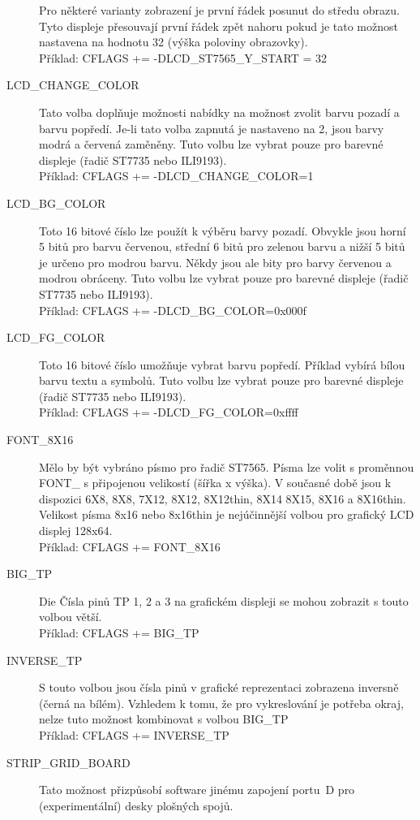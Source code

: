 \begin{description}
Pro některé varianty zobrazení je první řádek posunut do středu obrazu.
Tyto displeje přesouvají první řádek zpět nahoru
pokud je tato možnost nastavena na hodnotu 32 (výška poloviny obrazovky).\\
Příklad: CFLAGS += -DLCD\_ST7565\_Y\_START = 32
\item[LCD\_CHANGE\_COLOR]  Tato volba doplňuje možnosti nabídky na možnost
zvolit barvu pozadí a barvu popředí.
Je-li tato volba zapnutá je nastaveno na 2, jsou barvy modrá a červená zaměněny.
Tuto volbu lze vybrat pouze pro barevné displeje (řadič ST7735 nebo ILI9193).\\
Příklad: CFLAGS += -DLCD\_CHANGE\_COLOR=1
 \item[LCD\_BG\_COLOR] Toto 16 bitové číslo lze použít k výběru barvy pozadí.
Obvykle jsou horní 5 bitů pro barvu červenou, střední 6 bitů pro zelenou barvu
a nižší 5 bitů je určeno pro modrou barvu.
Někdy jsou ale bity pro barvy červenou a modrou obráceny.
Tuto volbu lze vybrat pouze pro barevné displeje (řadič ST7735 nebo ILI9193).\\
Příklad: CFLAGS += -DLCD\_BG\_COLOR=0x000f
 \item[LCD\_FG\_COLOR] Toto 16 bitové číslo umožňuje vybrat barvu popředí.
Příklad vybírá bílou barvu textu a symbolů.
Tuto volbu lze vybrat pouze pro barevné displeje (řadič ST7735 nebo ILI9193).\\
Příklad: CFLAGS += -DLCD\_FG\_COLOR=0xffff
  \item[FONT\_8X16] Mělo by být vybráno písmo pro řadič ST7565.
Písma lze volit s proměnnou FONT\_ s připojenou velikostí (šířka x výška).
V současné době jsou k dispozici 6X8, 8X8, 7X12, 8X12, 8X12thin, 8X14 8X15, 8X16 a 8X16thin.
Velikost písma 8x16 nebo 8x16thin je nejúčinnější volbou pro grafický LCD displej 128x64.\\
Příklad: CFLAGS += FONT\_8X16
 \item[BIG\_TP] Die Čísla pinů TP 1, 2 a 3 na grafickém displeji se mohou zobrazit s touto volbou větší.\\
Příklad: CFLAGS += BIG\_TP
 \item[INVERSE\_TP] S touto volbou jsou čísla pinů v grafické reprezentaci zobrazena inversně (černá na bílém).
Vzhledem k tomu, že pro vykreslování je potřeba okraj, nelze tuto možnost kombinovat s volbou BIG\_TP\\
Příklad: CFLAGS += INVERSE\_TP
  \item[STRIP\_GRID\_BOARD] Tato možnost přizpůsobí software jinému zapojení
portu~D pro (experimentální) desky plošných spojů.

\end{description}
